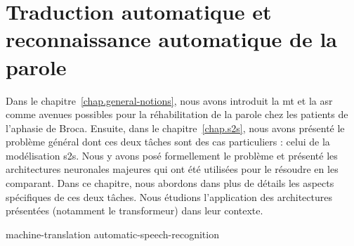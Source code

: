 \chapter{Traduction automatique et reconnaissance automatique de la parole}
\label{chap.mt-and-asr}

Dans le chapitre~\ref{chap.general-notions}, 
nous avons introduit la \gls{mt} et la \gls{asr} comme avenues possibles 
pour la réhabilitation de la parole chez les patients de l'aphasie de Broca.
Ensuite, dans le chapitre~\ref{chap.s2s}, nous avons présenté le problème général
dont ces deux tâches sont des cas particuliers : celui de la modélisation \gls{s2s}.
Nous y avons posé formellement le problème 
et présenté les architectures neuronales majeures qui ont été utilisées pour le résoudre en les comparant.
Dans ce chapitre, nous abordons dans plus de détails les aspects spécifiques de ces deux tâches.
Nous étudions l'application des architectures présentées (notamment le transformeur) dans leur contexte.

{machine-translation}
{automatic-speech-recognition}